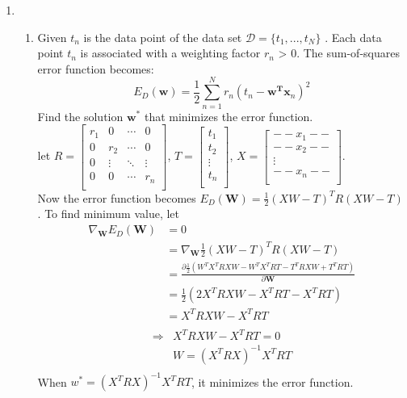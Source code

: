 \documentclass[12pt, a4paper]{article}
\begin{document}
\begin{enumerate}
\item 
\begin{enumerate}
    \item Given $t_n$ is the data point of the data set $\mathcal D=\{t_1, ...,t_N \}$ . Each data point $t_n$ is associated with a weighting factor $r_n$ > 0.
The sum-of-squares error function becomes:
$$E_D(\mathbf w) = \frac 1 2 \sum_{n=1}^{N}r_n(t_n -\mathbf w^{\mathbf T}\mathbf x_n)^2$$
Find the solution $\mathbf w^{*}$ that minimizes the error function.\\
    let $R=\begin{bmatrix}r_1&0&\cdots&0\\0&r_2&\cdots&0\\ 0&\vdots&\ddots&\vdots\\ 0&0&\cdots&r_n\\\end{bmatrix}$, $T=\begin{bmatrix}t_1\\t_2\\ \vdots\\ t_n\\\end{bmatrix}$, $X=\begin{bmatrix}--x_1--\\--x_2--\\ \vdots\\ --x_n--\\\end{bmatrix}$.\\
    Now the error function becomes $E_D(\mathbf W) = \frac{1}{2}(XW-T)^TR(XW-T)$.
    To find minimum value, let
    \begin{align*}
        \nabla_{\mathbf W}E_D(\mathbf W) &= 0\\
        &= \nabla_{\mathbf W} \frac{1}{2}(XW-T)^TR(XW-T)\\
        &= \frac{\partial \frac{1}{2} (W^TX^TRXW - W^TX^TRT - T^TRXW + T^TRT)}{\partial \mathbf W}\\
        &= \frac{1}{2} (2X^TRXW - X^TRT - X^TRT)\\
        &= X^TRXW - X^TRT\\
    \end{align*}
    \begin{align*}
        \Rightarrow & X^TRXW - X^TRT = 0\\
        &W = (X^TRX)^{-1}X^TRT\\
    \end{align*}
    When $w^* = (X^TRX)^{-1}X^TRT$, it minimizes the error function.

\end{enumerate}
\end{enumerate}
\end{document}
